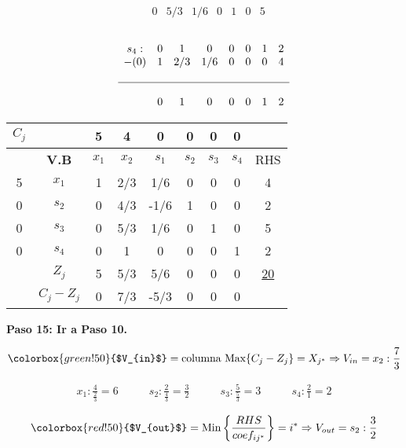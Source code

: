 \documentclass{templateNote}
\begin{document}
\begin{itemize}
\begin{equation*}
\begin{array}{cccccccc}
            & 0 & 5/3 & 1/6 & 0 & 1 & 0 & 5
        \end{array}
    \end{equation*}
    \\
    \begin{equation*}
        \begin{array}{cccccccc}
            s_4: & 0 & 1 & 0 & 0 & 0 & 1 & 2 \\
            -(0) & 1 & 2/3 & 1/6 & 0 & 0 & 0 & 4 \\
            \\ \hline \\
            & 0 & 1 & 0 & 0 & 0 & 1 & 2
        \end{array}
    \end{equation*}
\end{itemize}
\begin{center}
    \begin{tabular}{|c|c|c|c|c|c|c|c|c|}
        \hline
        $C_j$ & & 5 & 4 & 0 & 0 & 0 & 0 & \\ \hline
        & \textbf{V.B} & $x_1$ & $x_2$ & $s_1$ & $s_2$ & $s_3$ & $s_4$ & RHS \\ \hline
        5 & $x_1$ & 1 & 2/3 & 1/6 & 0 & 0 & 0 & 4 \\ \hline
        0 & $s_2$ & 0 & 4/3 & -1/6 & 1 & 0 & 0 & 2 \\ \hline
        0 & $s_3$ & 0 & 5/3 & 1/6 & 0 & 1 & 0 & 5 \\ \hline
        0 & $s_4$ & 0 & 1 & 0 & 0 & 0 & 1 & 2 \\ \hline
        & $Z_j$ & 5 & 5/3 & 5/6 & 0 & 0 & 0 & \underline{20} \\ \hline
        & $C_j - Z_j$ & 0 & 7/3 & -5/3 & 0 & 0 & 0 & \\ \hline
    \end{tabular}
\end{center}
\newpage
\textbf{Paso 15: Ir a Paso 10.}
\begin{center}
    \begin{equation*}
        \colorbox{green!50}{$V_{in}$} = \text{columna Max} \{C_j-Z_j\} = X_{j^*} \Rightarrow V_{in} = x_2 : \frac{7}{3} 
    \end{equation*}
\end{center}
\begin{align*}
    x_1: \frac{4}{\frac{2}{3}} = 6 \qquad & s_2: \frac{2}{\frac{4}{3}} = \frac{3}{2} \qquad & s_3: \frac{5}{\frac{5}{3}} = 3 \qquad & s_4: \frac{2}{1} = 2
\end{align*}
\begin{center}
    \begin{equation*}
        \colorbox{red!50}{$V_{out}$} = \text{Min} \left\{ \frac{RHS}{coef_{ij^*}} \right\} = i^* \Rightarrow V_{out} = s_2 : \frac{3}{2}
    \end{equation*}
\end{center}
\end{document}
